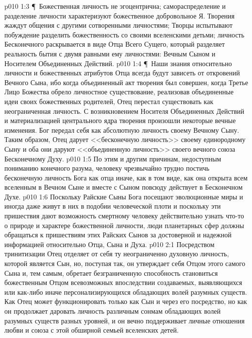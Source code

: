 \vs p010 1:3 \P\ Божественная личность не эгоцентрична; самораспределение и разделение личности характеризуют божественное добровольное Я. Творения жаждут общения с другими сотворенными личностями; Творцы испытывают побуждение разделить божественность со своими вселенскими детьми; личность Бесконечного раскрывается в виде Отца Всего Сущего, который разделяет реальность бытия с двумя равными ему личностями: Вечным Сыном и Носителем Объединенных Действий.
\vs p010 1:4 \P\ Наши знания относительно личности и божественных атрибутов Отца всегда будут зависеть от откровений Вечного Сына, ибо когда объединенный акт творения был совершен, когда Третье Лицо Божества обрело личностное существование, реализовав объединенные идеи своих божественных родителей, Отец перестал существовать как неограниченная личность. С возникновением Носителя Объединенных Действий и материализацией центрального ядра творения произошли некоторые вечные изменения. Бог передал себя как абсолютную личность своему Вечному Сыну. Таким образом, Отец дарует <<бесконечную личность>> своему единородному Сыну и оба они даруют <<объединенную личность>> своего вечного союза Бесконечному Духу.
\vs p010 1:5 По этим и другим причинам, недоступным пониманию конечного разума, человеку чрезвычайно трудно постичь бесконечную личность Бога как отца иначе, как в том виде, как она открыта всем вселенным в Вечном Сыне и вместе с Сыном повсюду действует в Бесконечном Духе.
\vs p010 1:6 Поскольку Райские Сыны Бога посещают эволюционные миры и иногда даже живут в них в подобии человеческой плоти и поскольку эти пришествия дают возможность смертному человеку действительно узнать что\hyp{}то о природе и характере божественной личности, люди планетарных сфер должны обращаться к пришествиям этих Райских Сынов за достоверной и надежной информацией относительно Отца, Сына и Духа.
\vs p010 2:1 Посредством тринитизации Отец отделяет от себя ту неограниченно духовную личность, которой является Сын, но, поступая так, он утверждает себя Отцом этого самого Сына и, тем самым, обретает безграниченную способность становиться божественным Отцом всевозможных впоследствии создаваемых, выявляющихся или как\hyp{}либо иначе персонализирующихся обладающих волей разумных существ. Как  Отец может функционировать только как Сын и через его посредство, но как  он продолжает даровать личность различным сонмам обладающих волей разумных существ разных уровней, и он вечно поддерживает личные отношения любви и союза с этой обширной семьей вселенских детей.
